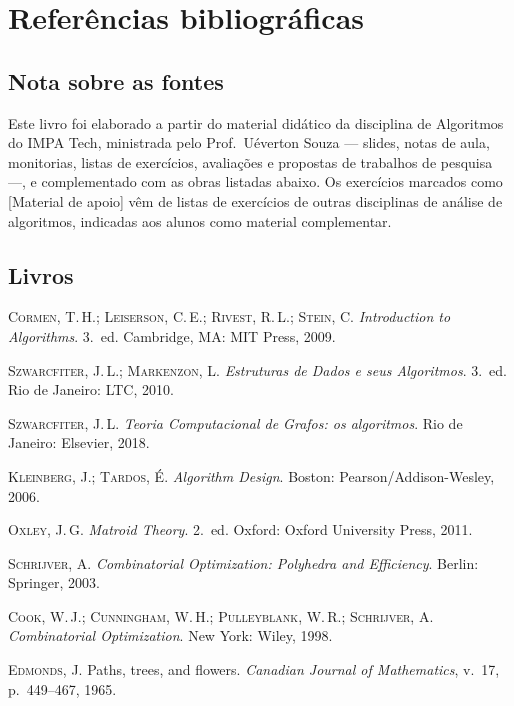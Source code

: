 \chapter{Referências bibliográficas}
\section*{Nota sobre as fontes}
Este livro foi elaborado a partir do material didático da disciplina de Algoritmos do IMPA Tech, ministrada pelo Prof.\ Uéverton Souza --- slides, notas de aula, monitorias, listas de exercícios, avaliações e propostas de trabalhos de pesquisa ---, e complementado com as obras listadas abaixo. Os exercícios marcados como \textsf{[Material de apoio]} vêm de listas de exercícios de outras disciplinas de análise de algoritmos, indicadas aos alunos como material complementar.

\section*{Livros}
\begin{enumerate}[label={[\arabic*]},leftmargin=2.2em]
  \item \textsc{Cormen}, T.\,H.; \textsc{Leiserson}, C.\,E.; \textsc{Rivest}, R.\,L.; \textsc{Stein}, C. \emph{Introduction to Algorithms}. 3.\ ed. Cambridge, MA: MIT Press, 2009.
  \item \textsc{Szwarcfiter}, J.\,L.; \textsc{Markenzon}, L. \emph{Estruturas de Dados e seus Algoritmos}. 3.\ ed. Rio de Janeiro: LTC, 2010.
  \item \textsc{Szwarcfiter}, J.\,L. \emph{Teoria Computacional de Grafos: os algoritmos}. Rio de Janeiro: Elsevier, 2018.
  \item \textsc{Kleinberg}, J.; \textsc{Tardos}, É. \emph{Algorithm Design}. Boston: Pearson/Addison-Wesley, 2006.
  \item \textsc{Oxley}, J.\,G. \emph{Matroid Theory}. 2.\ ed. Oxford: Oxford University Press, 2011.
  \item \textsc{Schrijver}, A. \emph{Combinatorial Optimization: Polyhedra and Efficiency}. Berlin: Springer, 2003.
  \item \textsc{Cook}, W.\,J.; \textsc{Cunningham}, W.\,H.; \textsc{Pulleyblank}, W.\,R.; \textsc{Schrijver}, A. \emph{Combinatorial Optimization}. New York: Wiley, 1998.
  \item \textsc{Edmonds}, J. Paths, trees, and flowers. \emph{Canadian Journal of Mathematics}, v.~17, p.~449--467, 1965.
\end{enumerate}

